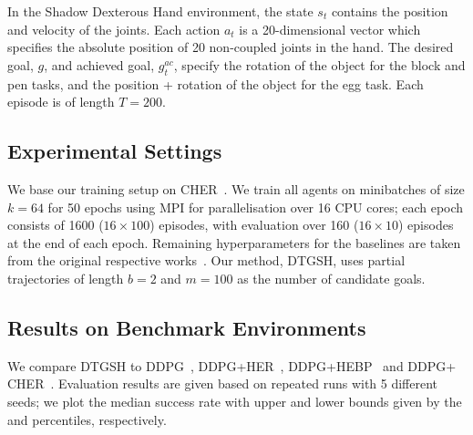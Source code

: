 In the Shadow Dexterous Hand environment, the state $s_{t}$ contains the position and velocity of the joints. Each action $a_{t}$ is a 20-dimensional vector which specifies the absolute position of 20 non-coupled joints in the hand. The desired goal, $g$, and achieved goal, $g^{ac}_t$, specify the rotation of the object for the block and pen tasks, and the position + rotation of the object for the egg task. Each episode is of length $T = 200$.

\subsection{Experimental Settings}
We base our training setup on CHER~\cite{fang2019curriculum}. We train all agents on minibatches of size $k = 64$ for 50 epochs using MPI for parallelisation over 16 CPU cores; each epoch consists of 1600 ($16 \times 100$) episodes, with evaluation over 160 ($16 \times 10$) episodes at the end of each epoch. Remaining hyperparameters for the baselines are taken from the original respective works~\cite{andrychowicz2017hindsight,fang2019curriculum,zhao2018energy}. Our method, DTGSH, uses partial trajectories of length $b = 2$ and $m = 100$ as the number of candidate goals. 


\subsection{Results on Benchmark Environments}
We compare DTGSH to DDPG~\cite{lillicrapContinuous}, DDPG+HER~\cite{andrychowicz2017hindsight}, DDPG+HEBP~\cite{zhao2018energy} and DDPG+\\CHER~\cite{fang2019curriculum}. Evaluation results are given based on repeated runs with 5 different seeds; we plot the median success rate with upper and lower bounds given by the  and  percentiles, respectively.

